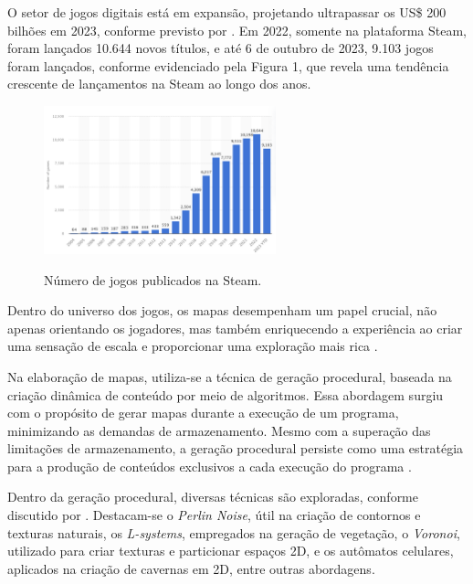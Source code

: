 O setor de jogos digitais está em expansão, projetando ultrapassar os US\$ 200 bilhões em 2023, conforme previsto por . Em 2022, somente na plataforma Steam, foram lançados 10.644 novos títulos, e até 6 de outubro de 2023, 9.103 jogos foram lançados, conforme evidenciado pela Figura 1, que revela uma tendência crescente de lançamentos na Steam ao longo dos anos.

\begin{figure}[!ht]
	\centering
    \caption{Número de jogos publicados na Steam.}
	\includegraphics[width=0.6\textwidth]{figures/steam_sales.png}
	\label{fig:steam_publishes}
\end{figure}

Dentro do universo dos jogos, os mapas desempenham um papel crucial, não apenas orientando os jogadores, mas também enriquecendo a experiência ao criar uma sensação de escala e proporcionar uma exploração mais rica \cite{video_game_maps, minimap}.

Na elaboração de mapas, utiliza-se a técnica de geração procedural, baseada na criação dinâmica de conteúdo por meio de algoritmos. Essa abordagem surgiu com o propósito de gerar mapas durante a execução de um programa, minimizando as demandas de armazenamento. Mesmo com a superação das limitações de armazenamento, a geração procedural persiste como uma estratégia para a produção de conteúdos exclusivos a cada execução do programa \cite{kenny2021procedural, lambda3}.

Dentro da geração procedural, diversas técnicas são exploradas, conforme discutido por . Destacam-se o \textit{Perlin Noise}, útil na criação de contornos e texturas naturais, os \textit{L-systems}, empregados na geração de vegetação, o \textit{Voronoi}, utilizado para criar texturas e particionar espaços 2D, e os autômatos celulares, aplicados na criação de cavernas em 2D, entre outras abordagens.

